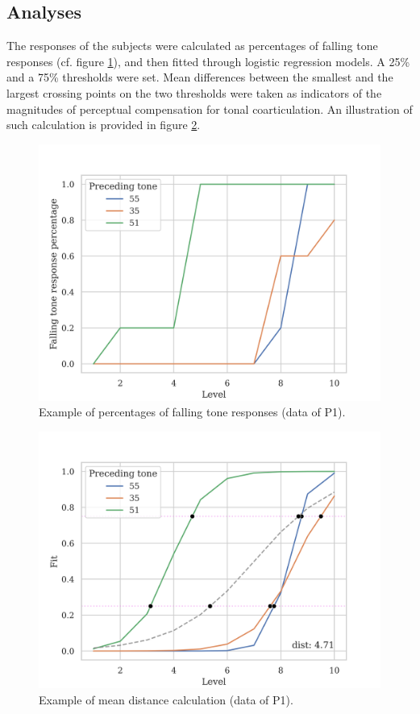 \documentclass[12pt]{report}
\begin{document}
\begin{CJK}{UTF8}{bsmi}
\subsection{Analyses}
The responses of the subjects were calculated as percentages of falling tone responses (cf. figure \ref{Figure:E2RawExample}), and then fitted through logistic regression models. A 25\% and a 75\% thresholds were set. Mean differences between the smallest and the largest crossing points on the two thresholds were taken as indicators of the magnitudes of perceptual compensation for tonal coarticulation. An illustration of such calculation is provided in figure \ref{Figure:E2ProcessedExample}.

\begin{figure}[h]
\centering
\includegraphics[width=\textwidth]{Figures/E2/RawExample.png}
\caption{Example of percentages of falling tone responses (data of P1).}
\label{Figure:E2RawExample}
\end{figure}

\begin{figure}[h]
\centering
\includegraphics[width=\textwidth]{Figures/E2/ProcessedExample.png}
\caption{Example of mean distance calculation (data of P1).}
\label{Figure:E2ProcessedExample}
\end{figure}


\end{CJK}
\end{document}
